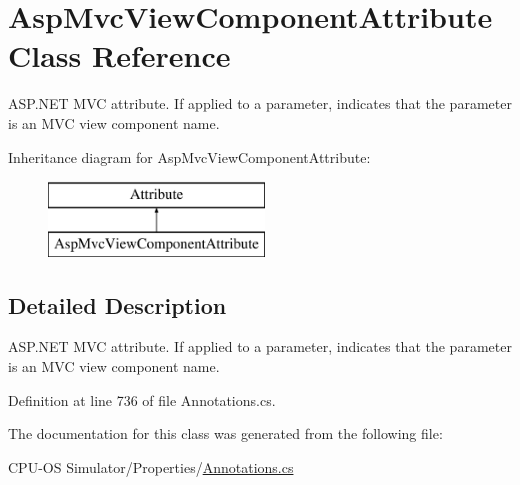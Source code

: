 \hypertarget{class_asp_mvc_view_component_attribute}{}\section{Asp\+Mvc\+View\+Component\+Attribute Class Reference}
\label{class_asp_mvc_view_component_attribute}


A\+S\+P.\+N\+E\+T M\+V\+C attribute. If applied to a parameter, indicates that the parameter is an M\+V\+C view component name.  


Inheritance diagram for Asp\+Mvc\+View\+Component\+Attribute\+:\begin{figure}[H]
\begin{center}
\leavevmode
\includegraphics[height=2.000000cm]{class_asp_mvc_view_component_attribute}
\end{center}
\end{figure}


\subsection{Detailed Description}
A\+S\+P.\+N\+E\+T M\+V\+C attribute. If applied to a parameter, indicates that the parameter is an M\+V\+C view component name. 



Definition at line 736 of file Annotations.\+cs.



The documentation for this class was generated from the following file\+:\begin{DoxyCompactItemize}
\item 
C\+P\+U-\/\+O\+S Simulator/\+Properties/\hyperlink{_annotations_8cs}{Annotations.\+cs}\end{DoxyCompactItemize}
